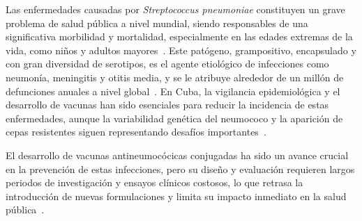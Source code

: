 

Las enfermedades causadas por \textit{Streptococcus pneumoniae} constituyen un grave problema de salud pública a nivel mundial, siendo responsables de una significativa morbilidad y mortalidad, especialmente en las edades extremas de la vida, como niños y adultos mayores~\cite{WHO2019}. Este patógeno, grampositivo, encapsulado y con gran diversidad de serotipos, es el agente etiológico de infecciones como neumonía, meningitis y otitis media, y se le atribuye alrededor de un millón de defunciones anuales a nivel global~\cite{OBrien2009}. En Cuba, la vigilancia epidemiológica y el desarrollo de vacunas han sido esenciales para reducir la incidencia de estas enfermedades, aunque la variabilidad genética del neumococo y la aparición de cepas resistentes siguen representando desafíos importantes~\cite{Gonzalez2017}.

El desarrollo de vacunas antineumocócicas conjugadas ha sido un avance crucial en la prevención de estas infecciones, pero su diseño y evaluación requieren largos periodos de investigación y ensayos clínicos costosos, lo que retrasa la introducción de nuevas formulaciones y limita su impacto inmediato en la salud pública~\cite{Plotkin2017}. 

